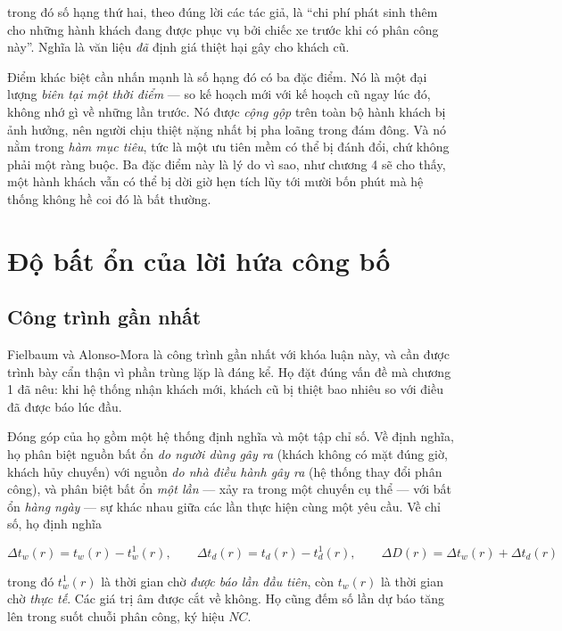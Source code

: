 trong đó số hạng thứ hai, theo đúng lời các tác giả, là ``chi phí phát sinh thêm cho những hành
khách đang được phục vụ bởi chiếc xe trước khi có phân công này''. Nghĩa là văn liệu \emph{đã}
định giá thiệt hại gây cho khách cũ.

Điểm khác biệt cần nhấn mạnh là số hạng đó có ba đặc điểm. Nó là một đại lượng \emph{biên tại
một thời điểm} --- so kế hoạch mới với kế hoạch cũ ngay lúc đó, không nhớ gì về những lần trước.
Nó được \emph{cộng gộp} trên toàn bộ hành khách bị ảnh hưởng, nên người chịu thiệt nặng nhất bị
pha loãng trong đám đông. Và nó nằm trong \emph{hàm mục tiêu}, tức là một ưu tiên mềm có thể bị
đánh đổi, chứ không phải một ràng buộc. Ba đặc điểm này là lý do vì sao, như chương 4 sẽ cho
thấy, một hành khách vẫn có thể bị dời giờ hẹn tích lũy tới mười bốn phút mà hệ thống không hề
coi đó là bất thường.

\section{Độ bất ổn của lời hứa công bố}

\subsection{Công trình gần nhất}

Fielbaum và Alonso-Mora \cite{fielbaum2020} là công trình gần nhất với khóa luận này, và cần
được trình bày cẩn thận vì phần trùng lặp là đáng kể. Họ đặt đúng vấn đề mà chương 1 đã nêu:
khi hệ thống nhận khách mới, khách cũ bị thiệt bao nhiêu so với điều đã được báo lúc đầu.

Đóng góp của họ gồm một hệ thống định nghĩa và một tập chỉ số. Về định nghĩa, họ phân biệt
nguồn bất ổn \emph{do người dùng gây ra} (khách không có mặt đúng giờ, khách hủy chuyến) với
nguồn \emph{do nhà điều hành gây ra} (hệ thống thay đổi phân công), và phân biệt bất ổn
\emph{một lần} --- xảy ra trong một chuyến cụ thể --- với bất ổn \emph{hàng ngày} --- sự khác
nhau giữa các lần thực hiện cùng một yêu cầu. Về chỉ số, họ định nghĩa

\begin{equation}
\Delta t_w(r) = t_w(r) - t^1_w(r), \qquad
\Delta t_d(r) = t_d(r) - t^1_d(r), \qquad
\Delta D(r) = \Delta t_w(r) + \Delta t_d(r)
\end{equation}

trong đó $t^1_w(r)$ là thời gian chờ \emph{được báo lần đầu tiên}, còn $t_w(r)$ là thời gian
chờ \emph{thực tế}. Các giá trị âm được cắt về không. Họ cũng đếm số lần dự báo tăng lên trong
suốt chuỗi phân công, ký hiệu $NC$.

